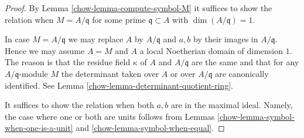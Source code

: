 \begin{proof}

By Lemma \ref{chow-lemma-compute-symbol-M} it suffices to show the relation when
$M = A/\mathfrak q$ for some prime $\mathfrak q \subset A$ with
$\dim(A/\mathfrak q) = 1$.

\medskip\noindent
In case $M = A/\mathfrak q$ we may replace $A$ by $A/\mathfrak q$ and
$a, b$ by their images in $A/\mathfrak q$. Hence we may assume $A = M$
and $A$ a local Noetherian domain of dimension $1$. The reason is
that the residue field $\kappa$ of $A$ and $A/\mathfrak q$ are
the same and that for any $A/\mathfrak q$-module $M$ the determinant
taken over $A$ or over $A/\mathfrak q$ are canonically identified.
See Lemma \ref{chow-lemma-determinant-quotient-ring}.

\medskip\noindent
It suffices to show the relation when both
$a, b$ are in the maximal ideal. Namely, the case where one
or both are units follows from Lemmas \ref{chow-lemma-symbol-when-one-is-a-unit}
and \ref{chow-lemma-symbol-when-equal}.


\end{proof}

